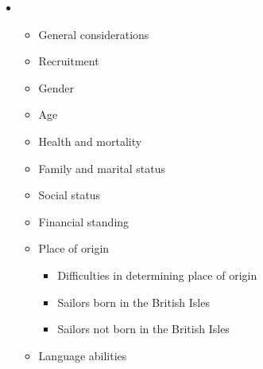 \setcounter{itemize}{2}
\begin{itemize}
\item \begin{itemize}
\item \begin{styleNormali}
General considerations 
\end{styleNormali}
\item \begin{styleNormali}
Recruitment 
\end{styleNormali}
\item \begin{styleNormali}
Gender 
\end{styleNormali}
\item \begin{styleNormali}
Age 
\end{styleNormali}
\item \begin{styleNormali}
Health and mortality 
\end{styleNormali}
\item \begin{styleNormali}
Family and marital status 
\end{styleNormali}
\item \begin{styleNormali}
Social status 
\end{styleNormali}
\item \begin{styleNormali}
Financial standing 
\end{styleNormali}
\item \begin{styleNormali}
Place of origin 
\end{styleNormali}

\begin{itemize}
\item \begin{styleNormali}
Difficulties in determining place of origin
\end{styleNormali}
\item \begin{styleNormali}
Sailors born in the British Isles 
\end{styleNormali}
\item \begin{styleNormali}
Sailors not born in the British Isles 
\end{styleNormali}
\end{itemize}
\item \begin{styleListParagraph}
Language abilities
\end{styleListParagraph}


\end{itemize}
\end{itemize}
